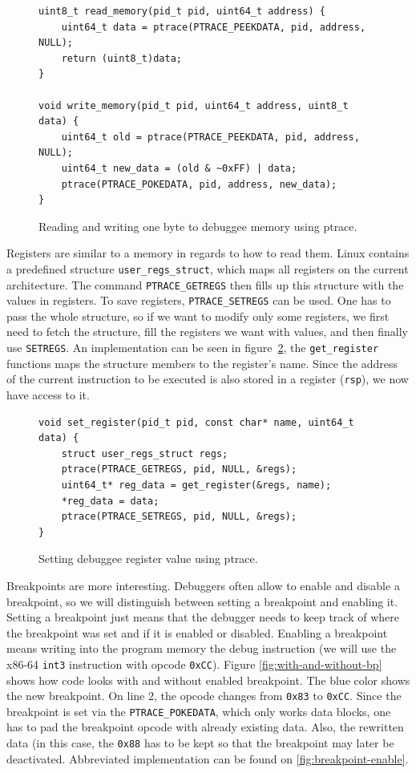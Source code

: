 \begin{figure}
    \begin{verbatim}
uint8_t read_memory(pid_t pid, uint64_t address) {
    uint64_t data = ptrace(PTRACE_PEEKDATA, pid, address, NULL);
    return (uint8_t)data;
}

void write_memory(pid_t pid, uint64_t address, uint8_t data) {
    uint64_t old = ptrace(PTRACE_PEEKDATA, pid, address, NULL);
    uint64_t new_data = (old & ~0xFF) | data;
    ptrace(PTRACE_POKEDATA, pid, address, new_data);
}
    \end{verbatim}
    \caption{Reading and writing one byte to debuggee memory using ptrace.}
    \label{fig:write-read}
\end{figure}

Registers are similar to a memory in regards to how to read them. Linux
contains a predefined structure \texttt{user\_regs\_struct}, which maps all
registers on the current architecture. The command \texttt{PTRACE\_GETREGS}
then fills up this structure with the values in registers. To save registers,
\texttt{PTRACE\_SETREGS} can be used. One has to pass the whole structure, so
if we want to modify only some registers, we first need to fetch the structure,
fill the registers we want with values, and then finally use \texttt{SETREGS}.
An implementation can be seen in figure~\ref{fig:set-register}, the
\texttt{get\_register} functions maps the structure members to the register's
name. Since the address of the current instruction to be executed is also
stored in a register (\texttt{rsp}), we now have access to it.

\begin{figure}
    \begin{verbatim}
void set_register(pid_t pid, const char* name, uint64_t data) {
    struct user_regs_struct regs;
    ptrace(PTRACE_GETREGS, pid, NULL, &regs);
    uint64_t* reg_data = get_register(&regs, name);
    *reg_data = data;
    ptrace(PTRACE_SETREGS, pid, NULL, &regs);
}
    \end{verbatim}
    \caption{Setting debuggee register value using ptrace.}
    \label{fig:set-register}
\end{figure}


Breakpoints are more interesting. Debuggers often allow to enable and disable a
breakpoint, so we will distinguish between setting a breakpoint and enabling
it. Setting a breakpoint just means that the debugger needs to keep track of
where the breakpoint was set and if it is enabled or disabled. Enabling a
breakpoint means writing into the program memory the debug instruction (we will
use the x86-64 \texttt{int3} instruction with opcode \texttt{0xCC}). Figure
\ref{fig:with-and-without-bp} shows how code looks with and without enabled
breakpoint. The blue color shows the new breakpoint. On line $2$, the opcode
changes from \texttt{0x83} to \texttt{0xCC}. Since the breakpoint is set via
the \texttt{PTRACE\_POKEDATA}, which only works data blocks, one has to pad the
breakpoint opcode with already existing data. Also, the rewritten data (in this
case, the \texttt{0x88} has to be kept so that the breakpoint may later be
deactivated. Abbreviated implementation can be found on
\ref{fig:breakpoint-enable}.

